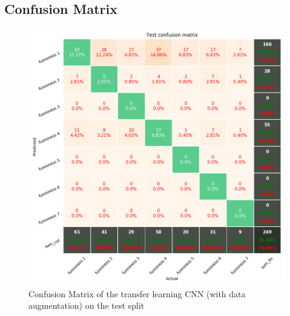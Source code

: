 \documentclass[draft,final,oneside]{vutinfth} %
\begin{document}
\subsection{Confusion Matrix}
\begin{figure}[ht]
	\centering
  	\includegraphics[width=1.0\textwidth]{graphics/transfer_confusion_test.png}
	\caption{Confusion Matrix of the transfer learning CNN (with data augmentation) on the test split}
	\label{fig:confusionmatrixtransferlearningtest}
\end{figure}
\end{document}
